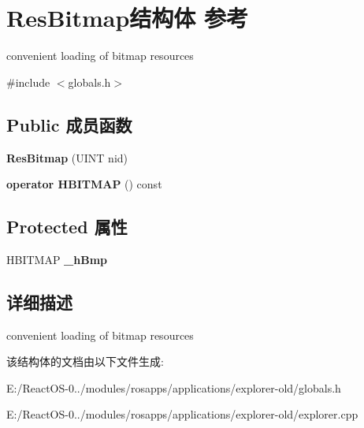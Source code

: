 \hypertarget{struct_res_bitmap}{}\section{Res\+Bitmap结构体 参考}
\label{struct_res_bitmap}


convenient loading of bitmap resources  




{\ttfamily \#include $<$globals.\+h$>$}

\subsection*{Public 成员函数}
\begin{DoxyCompactItemize}
\item 
\mbox{\label{struct_res_bitmap_a9ae6165ad1d322f77de59b0ea1b468c3}} 
{\bfseries Res\+Bitmap} (U\+I\+NT nid)
\item 
\mbox{\label{struct_res_bitmap_a170f7230aefe58d27c42f347b06047ff}} 
{\bfseries operator H\+B\+I\+T\+M\+AP} () const
\end{DoxyCompactItemize}
\subsection*{Protected 属性}
\begin{DoxyCompactItemize}
\item 
\mbox{\label{struct_res_bitmap_a137b89ba1c2d7db6ac4156be8e2e2d64}} 
H\+B\+I\+T\+M\+AP {\bfseries \+\_\+h\+Bmp}
\end{DoxyCompactItemize}


\subsection{详细描述}
convenient loading of bitmap resources 

该结构体的文档由以下文件生成\+:\begin{DoxyCompactItemize}
\item 
E\+:/\+React\+O\+S-\/0../modules/rosapps/applications/explorer-\/old/globals.\+h\item 
E\+:/\+React\+O\+S-\/0../modules/rosapps/applications/explorer-\/old/explorer.\+cpp\end{DoxyCompactItemize}
